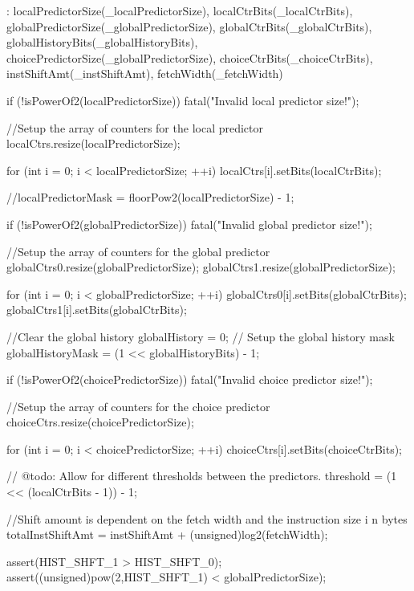 \begin{DoxyCode}
    : localPredictorSize(_localPredictorSize),
      localCtrBits(_localCtrBits),
      globalPredictorSize(_globalPredictorSize),
      globalCtrBits(_globalCtrBits),
      globalHistoryBits(_globalHistoryBits),
      choicePredictorSize(_globalPredictorSize),
      choiceCtrBits(_choiceCtrBits),
      instShiftAmt(_instShiftAmt),
      fetchWidth(_fetchWidth)
{
    if (!isPowerOf2(localPredictorSize)) {
        fatal("Invalid local predictor size!\n");
    }

    //Setup the array of counters for the local predictor
    localCtrs.resize(localPredictorSize);

    for (int i = 0; i < localPredictorSize; ++i)
        localCtrs[i].setBits(localCtrBits);

    //localPredictorMask = floorPow2(localPredictorSize) - 1;

    if (!isPowerOf2(globalPredictorSize)) {
        fatal("Invalid global predictor size!\n");
    }

    //Setup the array of counters for the global predictor
    globalCtrs0.resize(globalPredictorSize);
    globalCtrs1.resize(globalPredictorSize);

    for (int i = 0; i < globalPredictorSize; ++i) {
        globalCtrs0[i].setBits(globalCtrBits);
        globalCtrs1[i].setBits(globalCtrBits);
        }

    //Clear the global history
    globalHistory = 0;
    // Setup the global history mask
    globalHistoryMask = (1 << globalHistoryBits) - 1;

    if (!isPowerOf2(choicePredictorSize)) {
        fatal("Invalid choice predictor size!\n");
    }

    //Setup the array of counters for the choice predictor
    choiceCtrs.resize(choicePredictorSize);

    for (int i = 0; i < choicePredictorSize; ++i)
        choiceCtrs[i].setBits(choiceCtrBits);

    // @todo: Allow for different thresholds between the predictors.
    threshold = (1 << (localCtrBits - 1)) - 1;

        //Shift amount is dependent on the fetch width and the instruction size i
      n bytes
        totalInstShiftAmt = instShiftAmt + (unsigned)log2(fetchWidth);

        assert(HIST_SHFT_1 > HIST_SHFT_0);
        assert((unsigned)pow(2,HIST_SHFT_1) < globalPredictorSize);
}
\end{DoxyCode}


